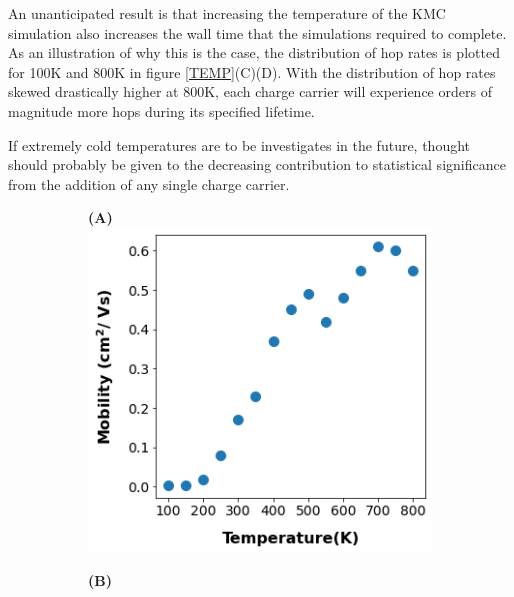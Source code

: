An unanticipated result is that increasing the temperature of the KMC
simulation also increases the wall time that the simulations required to
complete. As an illustration of why this is the case, the distribution of hop
rates is plotted for 100K and 800K in figure \ref{TEMP}(C)(D). With the distribution of hop rates skewed
drastically higher at 800K, each charge carrier will experience orders of
magnitude more hops during its specified lifetime. 

If extremely cold
temperatures are to be investigates in the future, thought should probably be given to
the decreasing contribution to statistical significance from the addition of
any single charge carrier. 

\begin{figure}
\centering
\begin{subfigure}{.5\textwidth}
    \textbf{(A)}
    \centering
    \includegraphics[width=\textwidth]{figures/temp.png}
    \newline
\end{subfigure}%
\begin{subfigure}{.5\textwidth}
    \textbf{(B)}
    \centering

\end{subfigure}
\end{figure}
